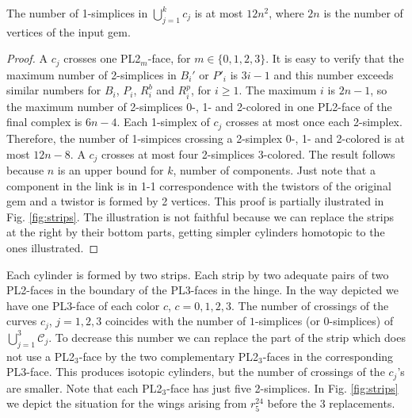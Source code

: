 \begin{proposition}
\label{prop:totalnumberofsimplices}
 The number of 1-simplices in $\bigcup_{j=1}^k c_j$ is 
at most $12n^2$, where $2n$ is the number
of vertices of the input gem.
\end{proposition}
\begin{proof} 
 A $c_j$ crosses one PL2$_m$-face, for $m\in \{0,1,2,3\}$.
 It is easy to verify that the maximum number of 2-simplices in $B_i'$ or $ P'_i$ is
 $3i-1$ and this number exceeds similar numbers for $B_i$, $ P_i$, $R^b_i$ and $R^p_i$, for 
 $i \ge  1$. The maximum $i$ is $2n-1$, so the maximum number of 2-simplices 0-, 1- and 2-colored in one PL2-face of the 
 final complex is $6n-4$. Each 1-simplex of $c_j$ crosses at most once each 2-simplex.
 Therefore, the number of 1-simpices crossing a 2-simplex 0-, 1- and 2-colored is at most $12n-8$. 
 A $c_j$ crosses at most four 2-simplices 3-colored. The result follows because $n$ is an upper 
 bound for $k$, number of components. Just note that a component in the link
 is in 1-1 correspondence with the twistors of the original gem and a twistor 
is formed by 2 vertices. This proof is partially ilustrated in Fig. \ref{fig:strips}.
 The illustration is not faithful because we can replace the strips at the right by
their bottom parts, getting simpler cylinders homotopic to the ones illustrated.
\end{proof}

Each cylinder is formed by two strips. Each strip by two adequate
pairs of two PL2-faces in the boundary of the PL3-faces in the hinge.
In the way depicted we have one PL3-face of each color $c$, $c=0,1,2,3$.
The number of  crossings of the curves $c_j$, $j=1,2,3$ coincides with the
number of $1$-simplices (or $0$-simplices) of $\bigcup_{j=1}^3 \mathcal{C}_j$.
To decrease this number we can replace the part of the strip which does not use a
PL2$_3$-face by the two complementary PL2$_3$-faces in the corresponding PL3-face.
This produces isotopic cylinders, but the number of crossings of the $c_j$'s are smaller. 
Note that each PL2$_3$-face has just five 2-simplices. In Fig. \ref{fig:strips} we 
depict the situation for the wings arising from $r_5^{24}$ before the 3 replacements.


